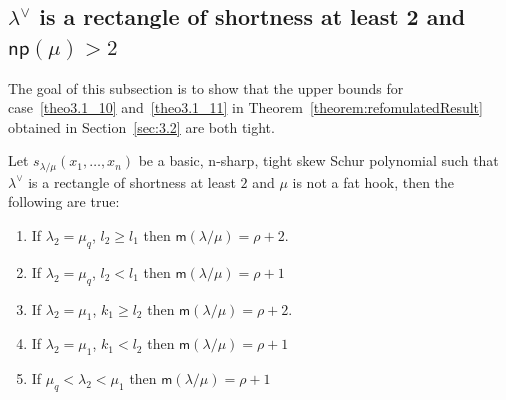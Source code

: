 \documentclass[ALCO,ThmDefs,Unicode,epreuves]{cedram}
\newcommand{\np}{\mathsf{np}}
\newcommand{\msf}{\mathsf{m}}
\begin{document}
\subsection{\texorpdfstring{$\lambda^\vee$}{lambda vee} is a rectangle of shortness at least 2 and \texorpdfstring{$\np (\mu) > 2$}{np(mu) > 2}}

The goal of this subsection is to show that the upper bounds for case~\ref{theo3.1_10} and~\ref{theo3.1_11} in Theorem~\ref{theorem:refomulatedResult} obtained in Section~\ref{sec:3.2} are both tight. 

\begin{theorem}
\label{thm:necessarynotfathook}
Let $s_{\lambda/\mu}(x_1,\ldots,x_n)$ be a basic, n-sharp, tight skew Schur polynomial such that $\lambda^\vee$ is a rectangle of shortness at least $2$ and $\mu$ is not a fat hook, then the following are true:
\begin{enumerate}[label=(\Roman*)]
 \item\label{theo4.9_1} If $\lambda_2 = \mu_q$, $l_2\geq l_1$ then $\msf (\lambda/\mu) = \rho+2$.
 \item\label{theo4.9_2} If $\lambda_2 = \mu_q$, $l_2< l_1$ then $\msf (\lambda/\mu) = \rho+1$
 \item\label{theo4.9_3} If $\lambda_2 = \mu_1$, $k_1\geq l_2$ then $\msf (\lambda/\mu) = \rho+2$.
 \item\label{theo4.9_4} If $\lambda_2 = \mu_1$, $k_1< l_2$ then $\msf (\lambda/\mu) = \rho+1$
 \item\label{theo4.9_5} If $\mu_q<\lambda_2<\mu_1$ then $\msf (\lambda/\mu) = \rho+1$
\end{enumerate}
\end{theorem}
\end{document}
